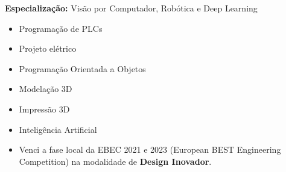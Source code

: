 


\textbf{Especialização:} Visão por Computador, Robótica e Deep Learning 














\medskip
{}  

\begin{itemize}  
    \item Programação de PLCs  
    \item Projeto elétrico  
    \item Programação Orientada a Objetos  
    \item Modelação 3D  
    \item Impressão 3D  
    \item Inteligência Artificial  
\end{itemize}  



\smallskip  
\begin{itemize}  
\item Venci a fase local da EBEC 2021 e 2023 (European BEST Engineering Competition) na modalidade de \textbf{Design Inovador}.  
\end{itemize}  
